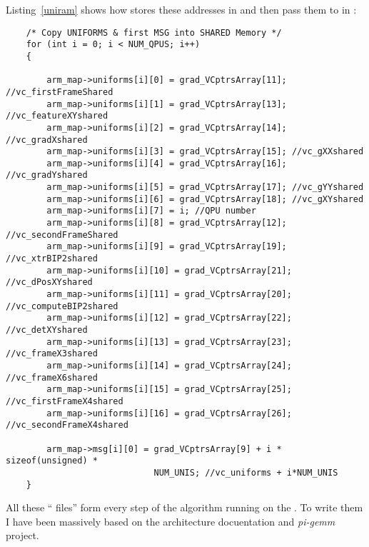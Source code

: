 \newpage
Listing~\ref{uniram} shows how \cpu{} stores these addresses in \ram{} and then pass them to \vc{} in :
\begin{lstlisting}
    /* Copy UNIFORMS & first MSG into SHARED Memory */
    for (int i = 0; i < NUM_QPUS; i++)
    {

        arm_map->uniforms[i][0] = grad_VCptrsArray[11]; //vc_firstFrameShared
        arm_map->uniforms[i][1] = grad_VCptrsArray[13]; //vc_featureXYshared
        arm_map->uniforms[i][2] = grad_VCptrsArray[14]; //vc_gradXshared
        arm_map->uniforms[i][3] = grad_VCptrsArray[15]; //vc_gXXshared
        arm_map->uniforms[i][4] = grad_VCptrsArray[16]; //vc_gradYshared
        arm_map->uniforms[i][5] = grad_VCptrsArray[17]; //vc_gYYshared
        arm_map->uniforms[i][6] = grad_VCptrsArray[18]; //vc_gXYshared
        arm_map->uniforms[i][7] = i; //QPU number
        arm_map->uniforms[i][8] = grad_VCptrsArray[12]; //vc_secondFrameShared
        arm_map->uniforms[i][9] = grad_VCptrsArray[19]; //vc_xtrBIP2shared
        arm_map->uniforms[i][10] = grad_VCptrsArray[21]; //vc_dPosXYshared
        arm_map->uniforms[i][11] = grad_VCptrsArray[20]; //vc_computeBIP2shared
        arm_map->uniforms[i][12] = grad_VCptrsArray[22]; //vc_detXYshared
        arm_map->uniforms[i][13] = grad_VCptrsArray[23]; //vc_frameX3shared
        arm_map->uniforms[i][14] = grad_VCptrsArray[24]; //vc_frameX6shared
        arm_map->uniforms[i][15] = grad_VCptrsArray[25]; //vc_firstFrameX4shared
        arm_map->uniforms[i][16] = grad_VCptrsArray[26]; //vc_secondFrameX4shared

        arm_map->msg[i][0] = grad_VCptrsArray[9] + i * sizeof(unsigned) *
                             NUM_UNIS; //vc_uniforms + i*NUM_UNIS
    }
\end{lstlisting}


All these \enquote{ files} form every step of the \flow{} algorithm running on the \vc{}. To write them I have been massively based on the \vc{} architecture docuentation \parencite{refVC} and \emph{pi-gemm} project.

